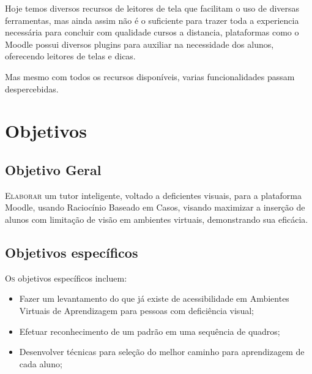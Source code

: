 Hoje temos diversos recursos de leitores de tela que facilitam o uso de diversas ferramentas, mas ainda assim não é o suficiente para trazer toda a experiencia necessária para concluir com qualidade cursos a distancia, plataformas como o Moodle possui diversos plugins para auxiliar na necessidade dos alunos, oferecendo leitores de telas e dicas.

Mas mesmo com todos os recursos disponíveis, varias funcionalidades passam despercebidas.


\section{Objetivos}

\subsection{Objetivo Geral}
\lettrine{E}{laborar} um tutor inteligente, voltado a deficientes visuais, para a plataforma Moodle, usando Raciocínio Baseado em Casos, visando maximizar a inserção de alunos com limitação de visão em ambientes virtuais, demonstrando sua eficácia.

\subsection{Objetivos específicos}
\lettrine{O}{s} objetivos específicos incluem:
\begin{itemize}
    \item Fazer um levantamento do que já existe de acessibilidade em Ambientes Virtuais de Aprendizagem para pessoas com deficiência visual;
    \item Efetuar reconhecimento de um padrão em uma sequência de quadros;
    \item Desenvolver técnicas para seleção do melhor caminho para aprendizagem
    de cada aluno;
\end{itemize}


